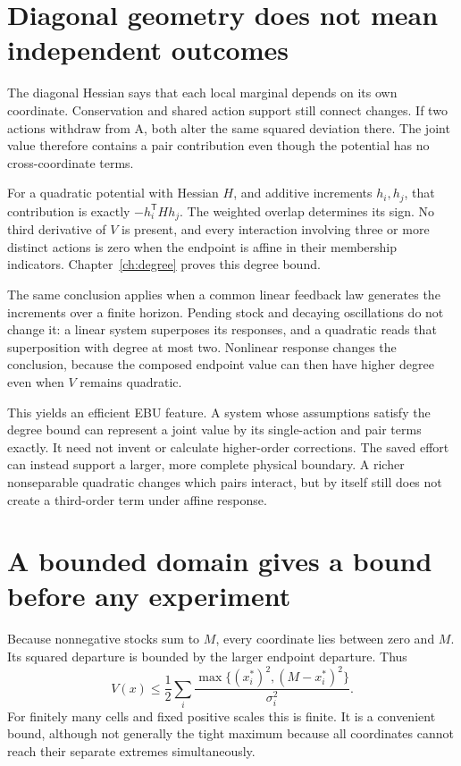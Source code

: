 \section{Diagonal geometry does not mean independent outcomes}
The diagonal Hessian says that each local marginal depends on its own coordinate. Conservation and shared action support still connect changes. If two actions withdraw from A, both alter the same squared deviation there. The joint value therefore contains a pair contribution even though the potential has no cross-coordinate terms.

For a quadratic potential with Hessian $H$, and additive increments $h_i,h_j$, that contribution is exactly $-h_i^{\mathsf T}Hh_j$. The weighted overlap determines its sign. No third derivative of $V$ is present, and every interaction involving three or more distinct actions is zero when the endpoint is affine in their membership indicators. Chapter~\ref{ch:degree} proves this degree bound.

The same conclusion applies when a common linear feedback law generates the increments over a finite horizon. Pending stock and decaying oscillations do not change it: a linear system superposes its responses, and a quadratic reads that superposition with degree at most two. Nonlinear response changes the conclusion, because the composed endpoint value can then have higher degree even when $V$ remains quadratic.

This yields an efficient EBU feature. A system whose assumptions satisfy the degree bound can represent a joint value by its single-action and pair terms exactly. It need not invent or calculate higher-order corrections. The saved effort can instead support a larger, more complete physical boundary. A richer nonseparable quadratic changes which pairs interact, but by itself still does not create a third-order term under affine response.

\section{A bounded domain gives a bound before any experiment}
Because nonnegative stocks sum to $M$, every coordinate lies between zero and $M$. Its squared departure is bounded by the larger endpoint departure. Thus
\begin{equation}
 V(x)\leq\frac12\sum_i
 \frac{\max\{(x_i^*)^2,(M-x_i^*)^2\}}{\sigma_i^2}.
\end{equation}
For finitely many cells and fixed positive scales this is finite. It is a convenient bound, although not generally the tight maximum because all coordinates cannot reach their separate extremes simultaneously.

